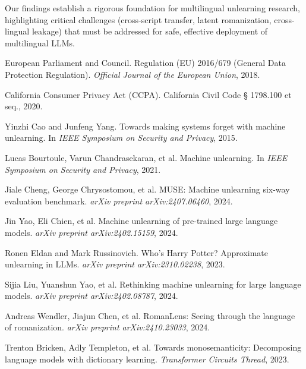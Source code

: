 \documentclass[11pt]{article}
\begin{document}
Our findings establish a rigorous foundation for multilingual unlearning research, highlighting critical challenges (cross-script transfer, latent romanization, cross-lingual leakage) that must be addressed for safe, effective deployment of multilingual LLMs.


\begin{thebibliography}{99}

European Parliament and Council.
\newblock Regulation (EU) 2016/679 (General Data Protection Regulation).
\newblock \textit{Official Journal of the European Union}, 2018.

California Consumer Privacy Act (CCPA).
\newblock California Civil Code § 1798.100 et seq., 2020.

Yinzhi Cao and Junfeng Yang.
\newblock Towards making systems forget with machine unlearning.
\newblock In \textit{IEEE Symposium on Security and Privacy}, 2015.

Lucas Bourtoule, Varun Chandrasekaran, et al.
\newblock Machine unlearning.
\newblock In \textit{IEEE Symposium on Security and Privacy}, 2021.

Jiale Cheng, George Chrysostomou, et al.
\newblock MUSE: Machine unlearning six-way evaluation benchmark.
\newblock \textit{arXiv preprint arXiv:2407.06460}, 2024.

Jin Yao, Eli Chien, et al.
\newblock Machine unlearning of pre-trained large language models.
\newblock \textit{arXiv preprint arXiv:2402.15159}, 2024.

Ronen Eldan and Mark Russinovich.
\newblock Who's Harry Potter? Approximate unlearning in LLMs.
\newblock \textit{arXiv preprint arXiv:2310.02238}, 2023.

Sijia Liu, Yuanshun Yao, et al.
\newblock Rethinking machine unlearning for large language models.
\newblock \textit{arXiv preprint arXiv:2402.08787}, 2024.

Andreas Wendler, Jiajun Chen, et al.
\newblock RomanLens: Seeing through the language of romanization.
\newblock \textit{arXiv preprint arXiv:2410.23033}, 2024.

Trenton Bricken, Adly Templeton, et al.
\newblock Towards monosemanticity: Decomposing language models with dictionary learning.
\newblock \textit{Transformer Circuits Thread}, 2023.


\end{thebibliography}
\end{document}
